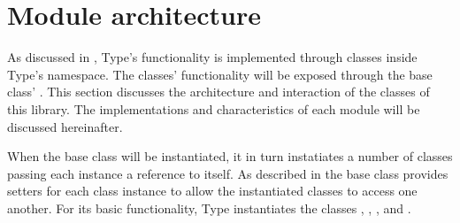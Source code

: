 




\section{Module architecture}
\label{sec:module_architecture}

As discussed in , Type's functionality is implemented through classes inside Type's namespace. The classes' functionality will be exposed through the base class' . This section discusses the architecture and interaction of the classes of this library. The implementations and characteristics of each module will be discussed hereinafter.

When the  base class will be instantiated, it in turn instatiates a number of classes passing each instance a reference to itself. As described in  the base class provides setters for each class instance to allow the instantiated classes to access one another. For its basic functionality, Type instantiates the classes , , ,  and .



